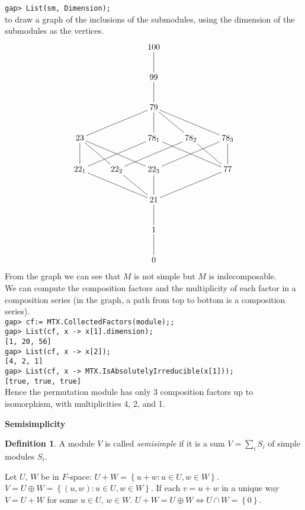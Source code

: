 \documentclass[12pt]{amsart}
\theoremstyle{definition}
\newtheorem{definition}[theorem]{Definition}
\begin{document}
\verb"gap> List(sm, Dimension);"\\
to draw a graph of the inclusions of the submodules, using the dimension of the submodules as the vertices.
$$\xymatrix{ && 100 \ar@{-}[d] \\
&& 99 \ar@{-}[d] \\
&& 79 \ar@{-}[dll] \ar@{-}[d] \ar@{-}[dr] \ar@{-}[drr] \\
23 \ar@{-}[d] \ar@{-}[dr] \ar@{-}[drr] && 78_1 \ar@{-}[dll] \ar@{-}[drr] & 78_2 \ar@{-}[dll] \ar@{-}[dr] & 78_3 \ar@{-}[dll] \ar@{-}[d]\\
22_1 \ar@{-}[drr] & 22_2 \ar@{-}[dr] & 22_3 \ar@{-}[d] && 77 \ar@{-}[dll] \\
&& 21 \ar@{-}[d] \\
&& 1 \ar@{-}[d] \\
&& 0}$$
From the graph we can see that $M$ is  not simple but $M$ is indecomposable.\\
We can compute the composition factors and the multiplicity of each factor in a composition series (in the graph, a path from top to bottom is a composition series).\\
\verb"gap> cf:= MTX.CollectedFactors(module);;"\\
\verb"gap> List(cf, x -> x[1].dimension);"\\
\verb"[1, 20, 56]"\\
\verb"gap> List(cf, x -> x[2]);"\\
\verb"[4, 2, 1]"\\
\verb"gap> List(cf, x -> MTX.IsAbsolutelyIrreducible(x[1]));"\\
\verb"[true, true, true]"\\
Hence the permutation module has only 3 composition factors up to isomorphism, with multiplicities 4, 2, and 1.

\begin{center}
\textbf{Semisimplicity}
\end{center}

\begin{definition}
A module $V$ is called \emph{semisimple} if it is a sum $V=\sum_i S_i$ of simple modules $S_i$.
\end{definition}

Let $U$, $W$ be in $F$-space: $U + W = \left\{ u + w: u \in U, w \in W \right\}$. $V = U \oplus W = \left\{ (u,w) : u \in U, w \in W \right\}$. If each $v = u + w$ in a unique way $V= U + W$ for some $u \in U$, $w \in W$. $U + W = U \oplus W \Leftrightarrow U \cap W = \left\{ 0 \right\}$.
\end{document}
